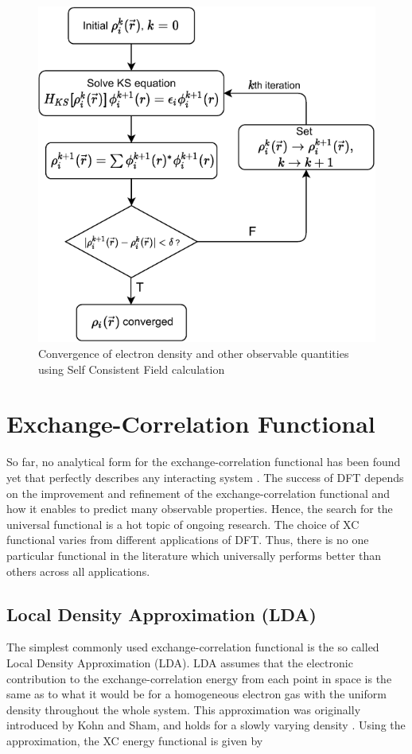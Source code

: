 \begin{figure}[tbh!]
	\centering
	\includegraphics[width=0.7\linewidth]{"images/scf_loop"}
	\caption[Kohn Sham loop]{Convergence of electron density and other observable quantities using Self Consistent Field calculation}
	\label{fig:scf_loop}
\end{figure}
\section{Exchange-Correlation Functional}
So far, no analytical form for the exchange-correlation functional has been found yet that perfectly describes any interacting system \citep{Verma2020,Marques2012,Segala2009}. The success of DFT depends on the improvement and refinement of the exchange-correlation functional and how it enables to predict many observable properties. Hence, the search for the universal functional is a hot topic of ongoing research. The choice of XC functional varies from different applications of DFT. Thus, there is no one particular functional in the literature which universally performs better than others across all applications.

\subsection{Local Density Approximation (LDA)}
The simplest commonly used exchange-correlation functional is the so called Local Density Approximation (LDA).  LDA assumes that the electronic contribution to the exchange-correlation energy from each point in space is the same as to what it would be for a homogeneous electron gas with the uniform density throughout the whole system. This approximation was originally introduced by Kohn and Sham, and holds for a slowly varying density \citep{Kohn1965}. Using the approximation, the XC energy functional is given by

